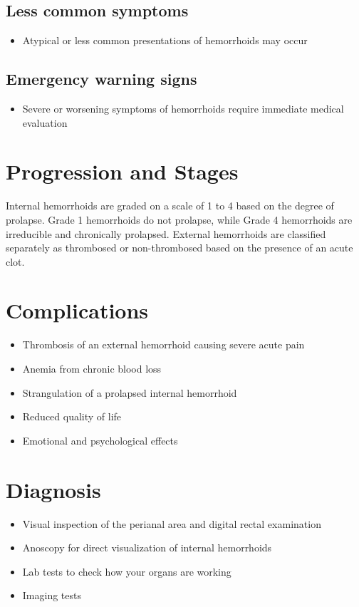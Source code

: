 \subsection{Less common symptoms}
\begin{itemize}[noitemsep]
  \item Atypical or less common presentations of hemorrhoids may occur
\end{itemize}

\subsection{Emergency warning signs}
\begin{itemize}[noitemsep]
  \item Severe or worsening symptoms of hemorrhoids require immediate medical evaluation
\end{itemize}
\section{Progression and Stages}
Internal hemorrhoids are graded on a scale of 1 to 4 based on the degree of prolapse. Grade 1 hemorrhoids do not prolapse, while Grade 4 hemorrhoids are irreducible and chronically prolapsed. External hemorrhoids are classified separately as thrombosed or non-thrombosed based on the presence of an acute clot.

\section{Complications}

\begin{itemize}[noitemsep]
  \item Thrombosis of an external hemorrhoid causing severe acute pain
  \item Anemia from chronic blood loss
  \item Strangulation of a prolapsed internal hemorrhoid
  \item Reduced quality of life
  \item Emotional and psychological effects
\end{itemize}

\section{Diagnosis}

\begin{itemize}[noitemsep]
  \item Visual inspection of the perianal area and digital rectal examination
  \item Anoscopy for direct visualization of internal hemorrhoids
  \item Lab tests to check how your organs are working
  \item Imaging tests
\end{itemize}

